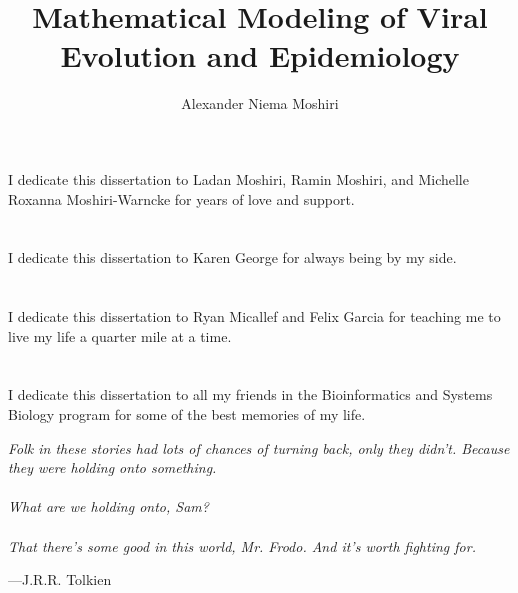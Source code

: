 \title{Mathematical Modeling of Viral Evolution and Epidemiology}
\author{Alexander Niema Moshiri}
\degreeyear{\the\year}



\begin{frontmatter}
\makefrontmatter

\begin{dedication}
\vspace*{\fill}
I dedicate this dissertation to Ladan Moshiri, Ramin Moshiri, and Michelle Roxanna Moshiri-Warncke for years of love and support.
~\\~\\~\\
I dedicate this dissertation to Karen George for always being by my side.
~\\~\\~\\
I dedicate this dissertation to Ryan Micallef and Felix Garcia for teaching me to live my life a quarter mile at a time.
~\\~\\~\\
I dedicate this dissertation to all my friends in the Bioinformatics and Systems Biology program for some of the best memories of my life.
\vspace*{\fill}
\end{dedication}

\begin{epigraph}
\begin{center}
\begin{minipage}{0.65\linewidth}
\onehalfspacing
{\large
\textit{Folk in these stories had lots of chances of turning back, only they didn't. Because they were holding onto something.}\\
~\\
\textit{What are we holding onto, Sam?}\\
~\\
\textit{That there's some good in this world, Mr. Frodo. And it's worth fighting for.}
\begin{flushright}
---J.R.R. Tolkien
\end{flushright}
}
\end{minipage}
\end{center}
\end{epigraph}


\end{frontmatter}
